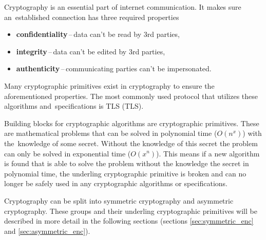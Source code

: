 Cryptography is an essential part of internet communication. It makes sure an~established connection has three required properties \cite{Bernstein149}
\begin{itemize}
  \item \textbf{confidentiality}\,--\,data can't be read by 3rd parties,
  \item \textbf{integrity}\,--\,data can't be edited by 3rd parties,
  \item \textbf{authenticity}\,--\,communicating parties can't be impersonated.
\end{itemize}
Many cryptographic primitives exist in cryptography to ensure the aforementioned properties. The most commonly used protocol that utilizes these algorithms and~specifications is TLS (\acl{TLS}).

Building blocks for cryptographic algorithms are cryptographic primitives. These are mathematical problems that can be solved in polynomial time ($O(n^x)$) with the~knowledge of some secret. Without the knowledge of this secret the problem can only be solved in exponential time ($O(x^n)$). This means if a new algorithm is found that is able to solve the problem without the knowledge the secret in polynomial time, the underling cryptographic primitive is broken and can no longer be safely used in any cryptographic algorithms or specifications.\cite{Smart2004}

Cryptography can be split into symmetric cryptography and asymmetric cryptography. These groups and their underling cryptographic primitives will be described in more detail in the following sections (sections \ref{sec:symmetric_enc} and \ref{sec:asymmetric_enc}).
